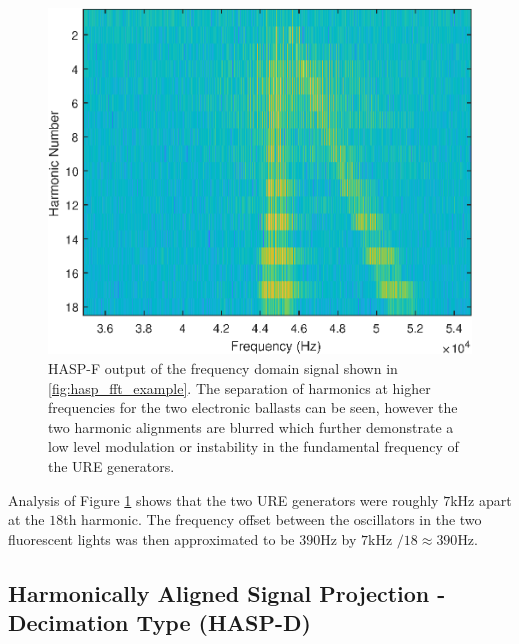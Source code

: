 \begin{figure}[tp]
	\includegraphics[width=\textwidth]{./dasp_algorithm_results/hasp_f_wide_filenum_9601.eps}
	\centering
	\caption{HASP-F output of the frequency domain signal shown in \ref{fig:hasp_fft_example}.  The separation of harmonics at higher frequencies for the two electronic ballasts can be seen, however the two harmonic alignments are blurred which further demonstrate a low level modulation or instability in the fundamental frequency of the URE generators.}
	\label{fig:haspf_example}
\end{figure}

Analysis of Figure \ref{fig:haspf_example} shows that the two URE generators were roughly $7$kHz apart at the $18$th harmonic.  The frequency offset between the oscillators in the two fluorescent lights was then approximated to be $390$Hz by $7$kHz $/18 \approx 390$Hz.  

\subsection[Harmonically Aligned Signal Projection - Decimation Type (HASP-D)]{Harmonically Aligned Signal Projection - Decimation Type (HASP-D)}
\label{Harmonically Aligned Signal Projection - Decimation Type}

